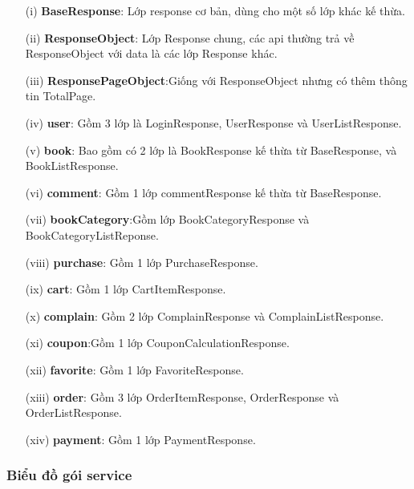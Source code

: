 \documentclass[../DoAn.tex]{subfiles}
\begin{document}
\begin{enumerate}
    \item [(i)] \textbf{BaseResponse}: Lớp response cơ bản, dùng cho một số lớp khác kế thừa.
    \item [(ii)]\textbf{ResponseObject}: Lớp Response chung, các api thường trả về ResponseObject với data là các lớp Response khác.
    \item[(iii)] \textbf{ResponsePageObject}:Giống với ResponseObject nhưng có thêm thông tin TotalPage.
    \item[(iv)] \textbf{user}: Gồm 3 lớp là LoginResponse, UserResponse và UserListResponse.
    \item[(v)] \textbf{book}: Bao gồm có 2 lớp là BookResponse kế thừa từ BaseResponse, và BookListResponse.
    \item[(vi)] \textbf{comment}: Gồm 1 lớp commentResponse kế thừa từ BaseResponse.
    \item[(vii)] \textbf{bookCategory}:Gồm lớp BookCategoryResponse và BookCategoryListReponse.
     \item[(viii)] \textbf{purchase}: Gồm 1 lớp PurchaseResponse.
    \item[(ix)] \textbf{cart}: Gồm 1 lớp CartItemResponse.
    \item[(x)] \textbf{complain}: Gồm 2 lớp ComplainResponse và ComplainListResponse.
    \item[(xi)] \textbf{coupon}:Gồm 1 lớp CouponCalculationResponse.
    \item[(xii)] \textbf{favorite}: Gồm 1 lớp FavoriteResponse.
    \item [(xiii)] \textbf{order}: Gồm 3 lớp OrderItemResponse, OrderResponse và OrderListResponse.
    \item[(xiv)] \textbf{payment}: Gồm 1 lớp PaymentResponse.
    
\end{enumerate}

\subsubsection{Biểu đồ gói service}
\end{document}
